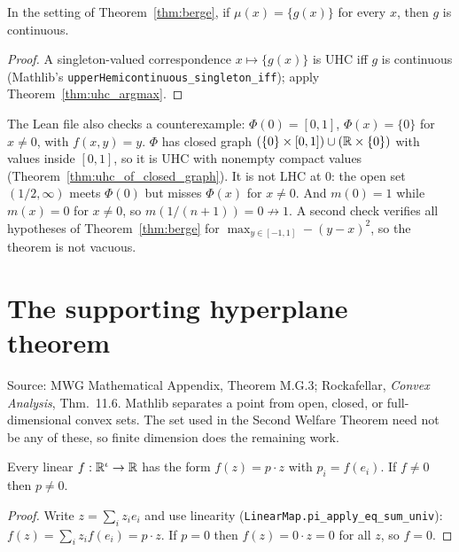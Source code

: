 \begin{corollary}
\label{cor:continuous_argmax_singleton}
\leanok
{}
In the setting of Theorem~\ref{thm:berge}, if $\mu(x) = \{g(x)\}$ for every $x$, then $g$ is continuous.
\end{corollary}
\begin{proof}
\leanok
A singleton-valued correspondence $x \mapsto \{g(x)\}$ is UHC iff $g$ is continuous (Mathlib's
\texttt{upperHemicontinuous\_singleton\_iff}); apply Theorem~\ref{thm:uhc_argmax}.
\end{proof}

\begin{remark}
\label{rem:jumpCorr}
\leanok
{}
The Lean file also checks a counterexample: $\Phi(0) = [0, 1]$, $\Phi(x) = \{0\}$ for $x \neq 0$, with
$f(x, y) = y$. $\Phi$ has closed graph $(\{0\} \times [0,1]) \cup (\mathbb{R} \times \{0\})$ with values inside
$[0, 1]$, so it is UHC with nonempty compact values (Theorem~\ref{thm:uhc_of_closed_graph}). It is not
LHC at $0$: the open set $(1/2, \infty)$ meets $\Phi(0)$ but misses $\Phi(x)$ for $x \neq 0$. And
$m(0) = 1$ while $m(x) = 0$ for $x \neq 0$, so $m(1/(n+1)) = 0 \not\to 1$. A second check verifies
all hypotheses of Theorem~\ref{thm:berge} for $\max_{y \in [-1,1]} -(y - x)^2$, so the theorem is not
vacuous.
\end{remark}

\section{The supporting hyperplane theorem}
\label{sec:supporting_hyperplane}

Source: MWG Mathematical Appendix, Theorem M.G.3; Rockafellar, \emph{Convex Analysis}, Thm.~11.6.
Mathlib separates a point from open, closed, or full-dimensional convex sets. The set used in the
Second Welfare Theorem need not be any of these, so finite dimension does the remaining work.

\begin{lemma}
\label{lem:cost_eq_linearMap}
\leanok
{}
Every linear $f : \mathbb{R}^\iota \to \mathbb{R}$ has the form $f(z) = p \cdot z$ with $p_i = f(e_i)$. If $f \neq 0$ then $p \neq 0$.
\end{lemma}
\begin{proof}
\leanok
Write $z = \sum_i z_i e_i$ and use linearity (\texttt{LinearMap.pi\_apply\_eq\_sum\_univ}):
$f(z) = \sum_i z_i f(e_i) = p \cdot z$. If $p = 0$ then $f(z) = 0 \cdot z = 0$ for all $z$, so $f = 0$.
\end{proof}

